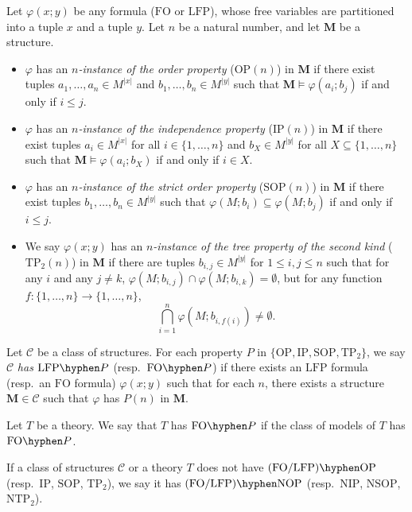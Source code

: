 \documentclass{lmcs}
\newcommand{\LFP}{\mathrm{LFP}}
\newcommand{\FO}{\mathrm{FO}}
\newcommand{\FOP}[1]{\FO\hyphen#1}
\newcommand{\LFPP}[1]{\LFP\hyphen#1}
\newcommand{\OP}{\mathrm{OP}}
\newcommand{\NOP}{\mathrm{NOP}}
\newcommand{\IP}{\mathrm{IP}}
\newcommand{\NIP}{\mathrm{NIP}}
\newcommand{\SOP}{\mathrm{SOP}}
\newcommand{\NSOP}{\mathrm{NSOP}}
\newcommand{\TPT}{\mathrm{TP}_2}
\newcommand{\NTPT}{\mathrm{NTP}_2}
\newcommand{\M}{\mathbf{M}}
\theoremstyle{thmC}
\begin{document}
\begin{defi}\label{def:properties}
Let $\varphi(x;y)$ be any formula ($\FO$ or $\LFP$), whose free variables are partitioned into a tuple $x$ and a tuple $y$. Let $n$ be a natural number, and let $\M$ be a structure. 
\end{defi}
\begin{itemize}
\item $\varphi$ has an \emph{$n$-instance of the order property} ($\OP(n)$) in $\M$ if there exist tuples $a_1,\dots,a_n\in M^{|x|}$ and $b_1,\dots,b_n\in M^{|y|}$ such that $\M\models \varphi(a_i;b_j)$ if and only if $i\leq j$. 

\item $\varphi$ has an \emph{$n$-instance of the independence property} ($\IP(n)$) in $\M$ if there exist tuples $a_i\in M^{|x|}$ for all $i\in \{1,\dots,n\}$ and $b_X\in M^{|y|}$ for all $X\subseteq \{1,\dots,n\}$ such that $\M\models \varphi(a_i;b_X)$ if and only if $i\in X$. 

\item $\varphi$ has an \emph{$n$-instance of the strict order property} ($\SOP(n)$) in $\M$ if there exist tuples $b_1,\dots,b_n\in M^{|y|}$ such that $\varphi(M;b_i)\subseteq \varphi(M;b_j)$ if and only if $i\leq j$. 



\item We say $\varphi(x;y)$ has an \emph{$n$-instance of the tree property
of the second kind} ($\TPT(n)$) in $\M$ if there are tuples $b_{i,j}\in M^{|y|}$
for $1\le i,j\le n$ such that for any $i$ and any $j\neq k$,  $\varphi(M;b_{i,j})\cap \varphi(M;b_{i,k}) = \emptyset$, but for any function $f\colon\{1,\dots,n\}\to\{1,\dots,n\}$,
\[
\bigcap_{i=1}^n \varphi(M;b_{i,f(i)}) \neq \emptyset.
\]
\end{itemize}

\begin{defi}
Let $\mathcal{C}$ be a class of structures. For each property $P$ in $\{\OP,\IP,\SOP,\TPT\}$, we say $\mathcal{C}$ \emph{has} $\LFPP{P}$ (resp.\ $\FOP{P}$) if there exists an $\LFP$ formula (resp.\ an $\FO$ formula) $\varphi(x;y)$ such that for each $n$, there exists a structure $\M\in \mathcal{C}$ such that $\varphi$ has $P(n)$ in $\M$. 

Let $T$ be a theory. We say that $T$ has $\FOP{P}$ if the class of models of $T$ has $\FOP{P}$.

If a class of structures $\mathcal{C}$ or a theory $T$ does not have $(\FO/\LFP)\hyphen\OP$ (resp.\ $\IP$, $\SOP$, $\TPT$), we say it has $(\FO/\LFP)\hyphen\NOP$ (resp.\ $\NIP$, $\NSOP$, $\NTPT$).
\end{defi}
\end{document}
